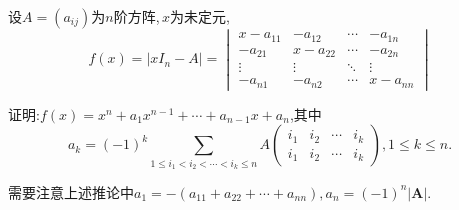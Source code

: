 \documentclass[../../main.tex]{subfiles}
\begin{document}
\begin{corollary}\label{corollary:特征多项式系数与矩阵子式的关系}
设\(A=(a_{ij})\)为\(n\)阶方阵,\(\,x\)为未定元,
\[
f(x)=\vert xI_n - A\vert = 
\begin{vmatrix}
x - a_{11} & -a_{12} & \cdots & -a_{1n} \\
-a_{21} & x - a_{22} & \cdots & -a_{2n} \\
\vdots & \vdots & \ddots & \vdots \\
-a_{n1} & -a_{n2} & \cdots & x - a_{nn}
\end{vmatrix}
\]

证明:\(f(x)=x^n + a_1x^{n - 1}+ \cdots + a_{n - 1}x + a_n\),其中
\[
a_k=(-1)^k \sum_{1\leq i_1 < i_2<\cdots <i_k\leq n} A
\begin{pmatrix}
i_1 & i_2 & \cdots & i_k \\
i_1 & i_2 & \cdots & i_k
\end{pmatrix}, 1\leq k\leq n.
\]
\end{corollary}
\begin{note}
需要注意上述推论中$a_1=-(a_{11}+a_{22}+\cdots+a_{nn}),a_n=\left( -1 \right) ^n\left| \boldsymbol{A} \right|.$
\end{note}
\end{document}
